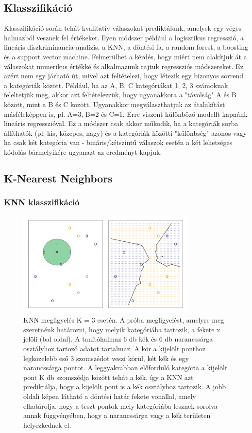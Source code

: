\documentclass[12pt]{article}
\theoremstyle{plain}
\begin{document}
\subsection{Klasszifikáció}


Klasszifikáció során tehát kvalitatív válaszokat prediktálunk, amelyek egy véges halmazból vesznek fel értékeket. Ilyen módszer például a logisztikus regresszió, a lineáris diszkriminancia-analízis, a KNN, a döntési fa, a random forest, a boosting és a support vector machine. Felmerülhet a kérdés, hogy miért nem alakítjuk át a válaszokat numerikus értékké és alkalmazunk rajtuk regressziós módszereket. Ez azért nem egy járható út, mivel azt feltételezi, hogy létezik egy bizonyos sorrend a kategóriák között. Például, ha az A, B, C kategóriákat 1, 2, 3 számoknak feleltetjük meg, akkor azt feltételezzük, hogy ugyanakkora a "távolság" A és B között, mint a B és C között. Ugyanakkor megválaszthatjuk az átalakítást másféleképpen is, pl.  A=3, B=2 és C=1. Erre viszont különböző modellt kapnánk lineáris regresszióval. Ez a módszer csak akkor működik, ha a kategóriák sorba állíthatók (pl. kis, közepes, nagy) és a kategóriák közötti "különbség" azonos vagy ha csak két kategória van - bináris/kétszintű válaszok esetén a két lehetséges kódolás bármelyikére ugyanazt az eredményt kapjuk. 


\subsection{K-Nearest Neighbors}
\subsubsection*{KNN klasszifikáció}
\begin{figure}
    \centering
    \includegraphics[width=0.8\textwidth]{media/knn1.png}
    \caption{KNN megfigyelés K = 3 esetén. A próba megfigyelést, amelyre meg szeretnénk határozni, hogy melyik kategóriába tartozik, a fekete x jelöli (bal oldal). A tanítóhalmaz 6 db kék és 6 db narancssárga osztályhoz tartozó adatot tartalmaz. A kör a kijelölt ponthoz legközelebb eső 3 szomszédot veszi körül, két kék és egy narancssárga pontot. A leggyakrabban előforduló kategória a kijelölt pont K db szomszédja között tehát a kék, így a KNN azt prediktálja, hogy a kijelölt pont is a kék osztályhoz tartozik. A jobb oldali képen látható a döntési határ fekete vonallal, amely elhatárolja, hogy a teszt pontok mely kategóriába lesznek sorolva annak függvényében, hogy a narancssárga vagy a kék területen helyezkednek el. } 
    \label{fig:knn1}
\end{figure}
\end{document}
